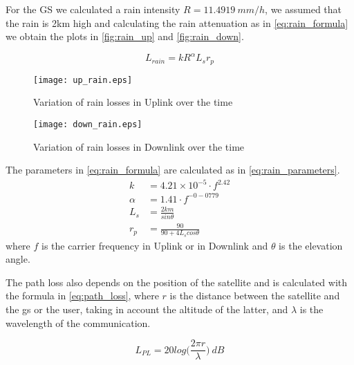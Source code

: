 		For the GS we calculated a rain intensity $R = 11.4919  ~mm/h$, we assumed that the rain is 2km high and calculating the rain attenuation as in \autoref{eq:rain_formula} we obtain the plots in \autoref{fig:rain_up} and \autoref{fig:rain_down}.

		\begin{equation}\label{eq:rain_formula}
			L_{rain} = kR^\alpha L_sr_p
		\end{equation}

		\begin{figure}[ht]
			\begin{minipage}{.5\textwidth}
			\centering
			\texttt{[image: up\_rain.eps]}
			\caption{Variation of rain losses in Uplink over the time}
			\label{fig:rain_up}
			\end{minipage}\hspace{0.5cm}
			\begin{minipage}{.5\textwidth}
			\centering
			\texttt{[image: down\_rain.eps]}
			\caption{Variation of rain losses in Downlink over the time}
			\label{fig:rain_down}
			\end{minipage}
		\end{figure}

		The parameters in \autoref{eq:rain_formula} are calculated as in \autoref{eq:rain_parameters}.
		\begin{equation}\label{eq:rain_parameters}
			\begin{split}
				k &= 4.21\times 10^{-5}\cdot f^{2.42}\\
				\alpha &= 1.41 \cdot f^{-0-0779}\\
				L_s &= \frac{2km}{sin\theta}\\
				r_p &= \frac{90}{90+4L_scos\theta}
			\end{split}
		\end{equation}
		where $f$ is the carrier frequency in Uplink or in Downlink and $\theta$ is the elevation angle.

		The path loss also depends on the position of the satellite and is calculated with the formula in \autoref{eq:path_loss}, where $r$ is the distance between the satellite and the \gls{gs} or the user, taking in account the altitude of the latter, and $\lambda$ is the wavelength of the communication.

		\begin{equation}\label{eq:path_loss}
			L_{PL} = 20log\bigg(\frac{2\pi r}{\lambda}\bigg) ~dB
		\end{equation}

